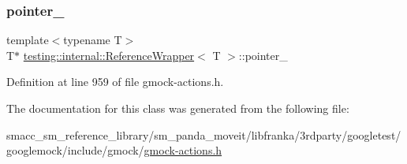 \subsubsection{\texorpdfstring{pointer\+\_\+}{pointer\_}}
{\footnotesize\ttfamily template$<$typename T$>$ \\
T$\ast$ \hyperlink{classtesting_1_1internal_1_1ReferenceWrapper}{testing\+::internal\+::\+Reference\+Wrapper}$<$ T $>$\+::pointer\+\_\+\hspace{0.3cm}{\ttfamily [private]}}



Definition at line 959 of file gmock-\/actions.\+h.



The documentation for this class was generated from the following file\+:\begin{DoxyCompactItemize}
\item 
smacc\+\_\+sm\+\_\+reference\+\_\+library/sm\+\_\+panda\+\_\+moveit/libfranka/3rdparty/googletest/googlemock/include/gmock/\hyperlink{gmock-actions_8h}{gmock-\/actions.\+h}\end{DoxyCompactItemize}
